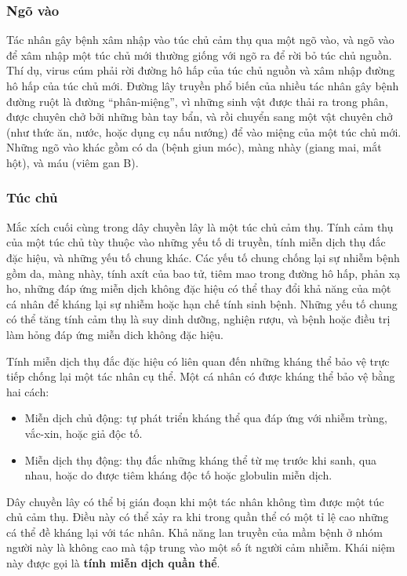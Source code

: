 \documentclass[
]{book}
\providecommand{\tightlist}{%
  \setlength{\itemsep}{0pt}\setlength{\parskip}{0pt}}
\begin{document}
\hypertarget{nguxf5-vuxe0o}{%
\subsubsection{Ngõ vào}\label{nguxf5-vuxe0o}}

Tác nhân gây bệnh xâm nhập vào túc chủ cảm thụ qua một ngõ vào, và ngõ vào để xâm nhập một túc chủ mới thường giống với ngõ ra để rời bỏ túc chủ nguồn. Thí dụ, virus cúm phải rời đường hô hấp của túc chủ nguồn và xâm nhập đường hô hấp của túc chủ mới. Đường lây truyền phổ biến của nhiều tác nhân gây bệnh đường ruột là đường ``phân-miệng'', vì những sinh vật được thải ra trong phân, được chuyên chở bởi những bàn tay bẩn, và rồi chuyển sang một vật chuyên chở (như thức ăn, nước, hoặc dụng cụ nấu nướng) để vào miệng của một túc chủ mới. Những ngõ vào khác gồm có da (bệnh giun móc), màng nhày (giang mai, mắt hột), và máu (viêm gan B).

\hypertarget{tuxfac-chux1ee7-1}{%
\subsubsection{Túc chủ}\label{tuxfac-chux1ee7-1}}

Mắc xích cuối cùng trong dây chuyền lây là một túc chủ cảm thụ. Tính cảm thụ của một túc chủ tùy thuộc vào những yếu tố di truyền, tính miễn dịch thụ đắc đặc hiệu, và những yếu tố chung khác. Các yếu tố chung chống lại sự nhiễm bệnh gồm da, màng nhày, tính axít của bao tử, tiêm mao trong đường hô hấp, phản xạ ho, những đáp ứng miễn dịch không đặc hiệu có thể thay đổi khả năng của một cá nhân để kháng lại sự nhiễm hoặc hạn chế tính sinh bệnh. Những yếu tố chung có thể tăng tính cảm thụ là suy dinh dưỡng, nghiện rượu, và bệnh hoặc điều trị làm hỏng đáp ứng miễn dich không đặc hiệu.

Tính miễn dịch thụ đắc đặc hiệu có liên quan đến những kháng thể bảo vệ trực tiếp chống lại một tác nhân cụ thể. Một cá nhân có được kháng thể bảo vệ bằng hai cách:

\begin{itemize}
\tightlist
\item
  Miễn dịch chủ động: tự phát triển kháng thể qua đáp ứng với nhiễm trùng, vắc-xin, hoặc giả độc tố.
\item
  Miễn dịch thụ động: thụ đắc những kháng thể từ mẹ trước khi sanh, qua nhau, hoặc do được tiêm kháng độc tố hoặc globulin miễn dịch.
\end{itemize}

Dây chuyền lây có thể bị gián đoạn khi một tác nhân không tìm được một túc chủ cảm thụ. Điều này có thể xảy ra khi trong quần thể có một tỉ lệ cao những cá thể đề kháng lại với tác nhân. Khả năng lan truyền của mầm bệnh ở nhóm người này là không cao mà tập trung vào một số ít người cảm nhiễm. Khái niệm này được gọi là \textbf{tính miễn dịch quần thể}.
\end{document}
